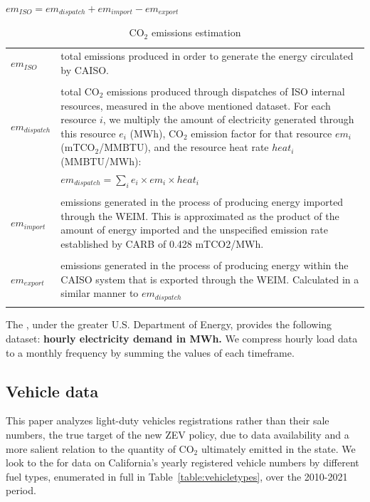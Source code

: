 \documentclass{article}
\begin{document}
\vspace{2mm}

\begin{table}
\begin{mdframed}[leftmargin=20pt,rightmargin=20pt]
\vspace{2mm}
\begin{center}
        \(em_{ISO} = em_{dispatch} + em_{import} - em_{export}\)\\
\end{center}
\vspace{3mm}
    \begin{tabular}{p{2cm}p{8cm}}
        \(em_{ISO}\) & total emissions produced in order to generate the energy circulated by CAISO.\\\\
        \(em_{dispatch}\) & total CO\(_2\) emissions produced through dispatches of ISO internal resources, measured in the above mentioned dataset. For each resource \(i\), we multiply the amount of electricity generated through this resource \(e_i\) (MWh), CO\(_2\) emission factor for that resource \(em_i\) (mTCO\(_2\)/MMBTU), and the resource heat rate \(heat_i\) (MMBTU/MWh):\\
        & \(em_{dispatch} = \sum_{i}e_{i} \times em_{i} \times heat_i\)\\\\
        \(em_{import}\) & emissions generated in the process of producing energy imported through the WEIM. This is approximated as the product of the amount of energy imported and the unspecified emission rate established by CARB of 0.428 mTCO2/MWh.\\\\
        \(em_{export}\) & emissions generated in the process of producing energy within the CAISO system that is exported through the WEIM. Calculated in a similar manner to \(em_{dispatch}\)\\\\
    \end{tabular}
    \end{mdframed}
    \caption{\label{table:emissionsestimation}CO\(_2\) emissions estimation}
\end{table}

The \cite{eia:energydata}, under the greater U.S. Department of Energy, provides the following dataset: \textbf{hourly electricity demand in MWh.} We compress hourly load data to a monthly frequency by summing the values of each timeframe.


\subsection{Vehicle data}
This paper analyzes light-duty vehicles registrations rather than their sale numbers, the true target of the new ZEV policy, due to data availability and a more salient relation to the quantity of CO\(_2\) ultimately emitted in the state. We look to the \cite{caec:vehicledata}  for data on California's yearly registered vehicle numbers by different fuel types, enumerated in full in Table~\ref{table:vehicletypes}, over the 2010-2021 period.
\end{document}
